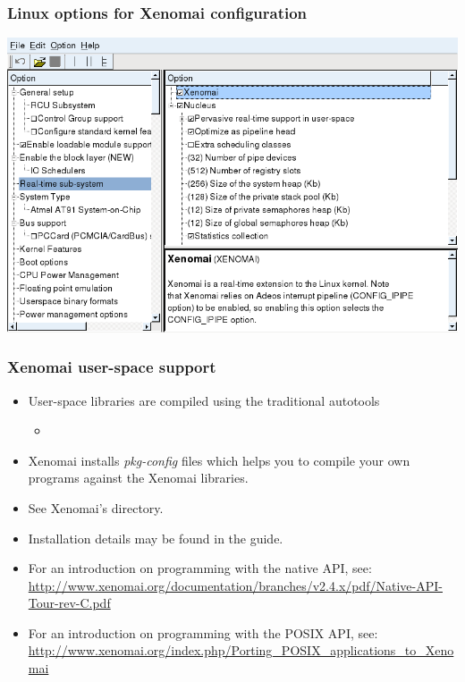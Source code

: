 \begin{frame}
  \frametitle{Linux options for Xenomai configuration}
  \begin{center}
    \includegraphics[width=\textwidth]{slides/sysdev-realtime/xenomai-kernel-config.png}
  \end{center}
\end{frame}

\begin{frame}
  \frametitle{Xenomai user-space support}
  \begin{itemize}
  \item User-space libraries are compiled using the traditional autotools
    \begin{itemize}
    \item {}
    \end{itemize}
  \item Xenomai installs {\em pkg-config} files which helps you to
    compile your own programs against the Xenomai libraries.
  \item See Xenomai's  directory.
  \item Installation details may be found in the 
    guide.
  \item For an introduction on programming with the native API, see:\\
    \url{http://www.xenomai.org/documentation/branches/v2.4.x/pdf/Native-API-Tour-rev-C.pdf}
  \item For an introduction on programming with the POSIX API, see:\\
    \url{http://www.xenomai.org/index.php/Porting_POSIX_applications_to_Xenomai}
  \end{itemize}
\end{frame}

